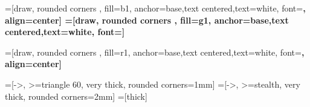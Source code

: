 =[draw, rounded corners , fill=b1,
anchor=base,text centered,text=white, font=\bfseries, align=center] %
=[draw, rounded corners , fill=g1,
anchor=base,text centered,text=white, font=\bfseries] %

=[draw, rounded corners , fill=r1,
anchor=base,text centered,text=white, font=\bfseries, align=center] %

=[->, >=triangle 60, very thick, rounded corners=1mm]
=[->, >=stealth, very thick, rounded corners=2mm]
=[thick]





\usepackage[cm]{sfmath}
\renewcommand\dot[1]{\text{\stackon[1pt]{$#1$}{.}}}



\beamertemplatenavigationsymbolsempty

\newcommand{\RightCrlBrc}[1]{$\pmb{\left. \rule{0pt}{#1}\right\}} $}

\newcommand{\TextSoulign}[3]{\textcolor{#1}{\underline{#2\textcolor{black}{#3}}}}
\newcommand\dgs[0]{$^\circ$}
\newcommand\dgsC[0]{$\,^{\circ}{\rm C}$}

\newcommand\up[1]{$^{\text{#1}}$}
\newcommand*\dif{\mathop{}\!\textnormal{\slshape d}}


\newcommand\tbf[1]{\textbf{#1}}
\newcommand\tit[1]{\textit{#1}}
\newcommand\tcit[2]{\textcolor{#1}{\textit{#2}}}

\newcommand{\chckmrk}[0]{\Large \textcolor{mygreen}{\checkmark}}

\renewcommand{\alert}[1]{\textcolor{myOrng}{\tbf{#1}}}






